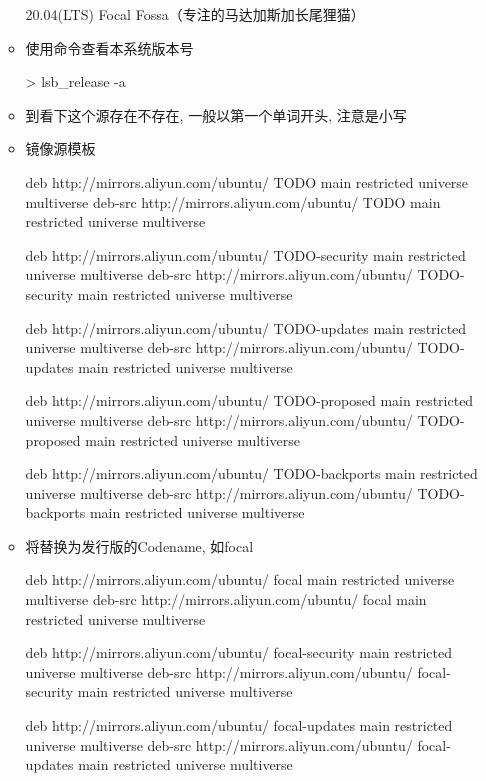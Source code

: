\begin{itemize}
\begin{itemize}
\begin{messagebox}
20.04(LTS) Focal Fossa（专注的马达加斯加长尾狸猫）
\end{messagebox}

\item 使用命令查看本系统版本号
\begin{commandbox}
 > lsb_release -a
\end{commandbox}

\item 到看下这个源存在不存在, 一般以第一个单词开头, 注意是小写
\item 镜像源模板
\begin{messagebox}
deb http://mirrors.aliyun.com/ubuntu/ TODO main restricted universe multiverse
deb-src http://mirrors.aliyun.com/ubuntu/ TODO main restricted universe multiverse

deb http://mirrors.aliyun.com/ubuntu/ TODO-security main restricted universe multiverse
deb-src http://mirrors.aliyun.com/ubuntu/ TODO-security main restricted universe multiverse

deb http://mirrors.aliyun.com/ubuntu/ TODO-updates main restricted universe multiverse
deb-src http://mirrors.aliyun.com/ubuntu/ TODO-updates main restricted universe multiverse

deb http://mirrors.aliyun.com/ubuntu/ TODO-proposed main restricted universe multiverse
deb-src http://mirrors.aliyun.com/ubuntu/ TODO-proposed main restricted universe multiverse

deb http://mirrors.aliyun.com/ubuntu/ TODO-backports main restricted universe multiverse
deb-src http://mirrors.aliyun.com/ubuntu/ TODO-backports main restricted universe multiverse
\end{messagebox}

\item 将替换为发行版的Codename, 如focal
\begin{messagebox}
deb http://mirrors.aliyun.com/ubuntu/ focal main restricted universe multiverse
deb-src http://mirrors.aliyun.com/ubuntu/ focal main restricted universe multiverse

deb http://mirrors.aliyun.com/ubuntu/ focal-security main restricted universe multiverse
deb-src http://mirrors.aliyun.com/ubuntu/ focal-security main restricted universe multiverse

deb http://mirrors.aliyun.com/ubuntu/ focal-updates main restricted universe multiverse
deb-src http://mirrors.aliyun.com/ubuntu/ focal-updates main restricted universe multiverse


\end{messagebox}
\end{itemize}
\end{itemize}
